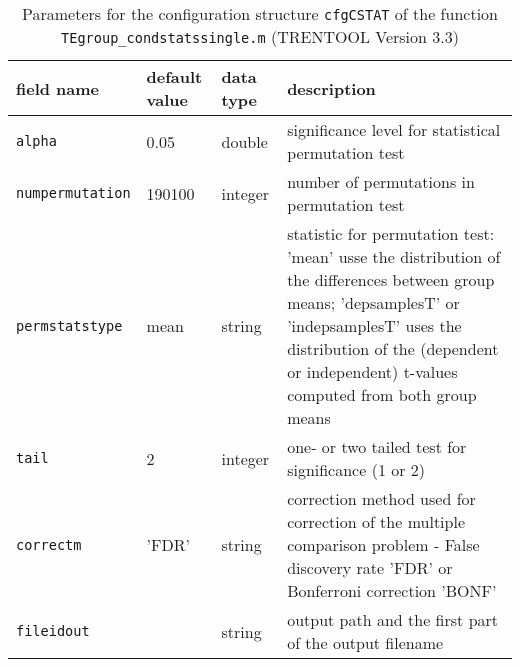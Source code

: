 \begin{table}[H]
\small \centering
\caption[Parameters \texttt{cfgCSTAT}]{Parameters for the configuration structure \texttt{cfgCSTAT} of the function \texttt{TEgroup\_condstatssingle.m} (TRENTOOL Version 3.3)} 
\begin{tabularx}{\textwidth}{p{2cm}p{1.5cm}p{1.1cm}X} \toprule
\textbf{field name} & \textbf{default value} & \textbf{data type} & \textbf{description} \\ \midrule
\verb+alpha+ &  0.05 & double & significance level for statistical permutation test \\
\verb+numpermutation+ & 190100 & integer &  number of permutations in permutation test \\
\rowcolor{Gray}
\verb+permstatstype+ & mean & string &  statistic for permutation test: 'mean' usse the distribution of the differences between group means; 'depsamplesT' or 'indepsamplesT' uses the distribution of the (dependent or independent) t-values computed from both group means\\
\verb+tail+ & 2 & integer &  one- or two tailed test for significance (1 or 2) \\
\rowcolor{Gray}
\verb+correctm+ & 'FDR' & string &  correction method used for correction of the multiple comparison problem - False discovery rate 'FDR' or Bonferroni correction 'BONF'\\
\verb+fileidout+ & & string &  output path and the first part of the output filename\\ \bottomrule
\end{tabularx} \label{tab:cfgCSTAT}
\end{table}


%
%
%
